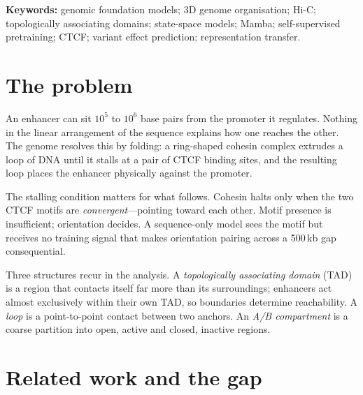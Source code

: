 \documentclass[11pt,a4paper]{article}
\begin{document}
\vspace{2mm}
\noindent\textbf{Keywords:} genomic foundation models; 3D genome organisation;
Hi-C; topologically associating domains; state-space models; Mamba;
self-supervised pretraining; CTCF; variant effect prediction; representation
transfer.

\tableofcontents
\newpage

\section{The problem}

An enhancer can sit $10^5$ to $10^6$ base pairs from the promoter it regulates.
Nothing in the linear arrangement of the sequence explains how one reaches the
other. The genome resolves this by folding: a ring-shaped cohesin complex
extrudes a loop of DNA until it stalls at a pair of CTCF binding sites, and the
resulting loop places the enhancer physically against the promoter.

The stalling condition matters for what follows. Cohesin halts only when the two
CTCF motifs are \emph{convergent}---pointing toward each other. Motif presence is
insufficient; orientation decides. A sequence-only model sees the motif but
receives no training signal that makes orientation pairing across a
500\,kb gap consequential.

Three structures recur in the analysis. A \emph{topologically associating
domain} (TAD) is a region that contacts itself far more than its surroundings;
enhancers act almost exclusively within their own TAD, so boundaries determine
reachability. A \emph{loop} is a point-to-point contact between two anchors. An
\emph{A/B compartment} is a coarse partition into open, active and closed,
inactive regions.

\section{Related work and the gap}
\end{document}
